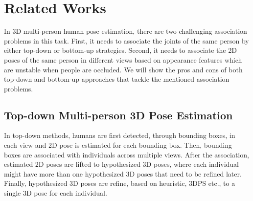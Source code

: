 
\chapter{Related Works}\label{chapter:introduction}
In 3D multi-person human pose estimation, there are two challenging association problems in this task. First, it needs to associate the joints of the same person by either top-down or bottom-up strategies. Second, it needs to associate the 2D poses of the same person in different views based on appearance features which are unstable when people are occluded. We will show the pros and cons of both top-down and bottom-up approaches that tackle the mentioned association problems.
\section{Top-down Multi-person 3D Pose Estimation}
In top-down methods, humans are first detected, through bounding boxes, in
each view and 2D pose is estimated for each bounding box. Then, bounding boxes
are associated with individuals across multiple views. After the association, estimated 2D poses are lifted to hypothesized 3D poses, where each individual might have more than one hypothesized 3D poses that need to be refined later. Finally, hypothesized 3D poses are refine, based on heuristic, 3DPS etc., to a single 3D pose for each individual.
